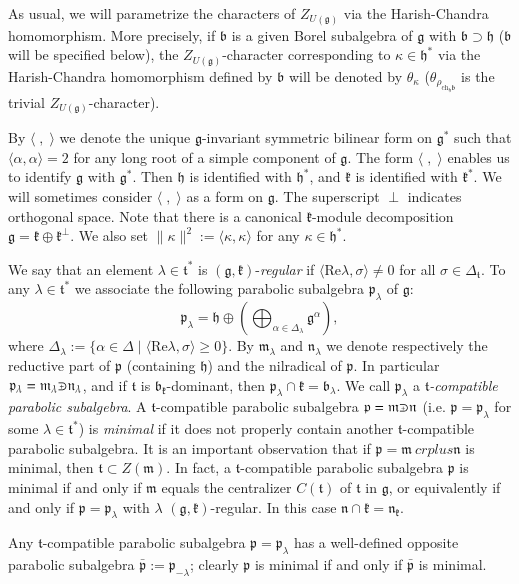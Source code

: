 \documentclass[11pt]{amsart}
\renewcommand{\tt}{\mathfrak{t}}
\newcommand{\kk}{\mathfrak{k}}
\newcommand{\nn}{\mathfrak{n}}
\newcommand{\mm}{\mathfrak{m}}
\newcommand{\hh}{\mathfrak{h}}
\newcommand{\pp}{\mathfrak{p}}
\renewcommand{\gg}{\mathfrak{g}}
\newcommand{\bb}{\mathfrak{b}}
\newcommand{\ch}{\mathrm{ch}}
\def\crplus{\hbox{$\supset${\raise1.05pt\hbox{\kern -0.55em ${\scriptscriptstyle +}$}}\ }}
\begin{document}
As usual, we will parametrize the characters of $Z_{U(\gg)}$ via the Harish-Chandra homomorphism. More precisely, if $\bb$ is a given Borel subalgebra of $\gg$ with $\bb\supset\hh$ ($\bb$ will be specified below), the $Z_{U(\gg)}$-character corresponding to $\kappa\in\hh^*$ via the Harish-Chandra homomorphism defined by $\bb$ will be denoted by $\theta_\kappa$ ($\theta_{\rho_{\ch_\hh\bb}}$ is the trivial $Z_{U(\gg)}$-character).

By $\langle\;,\;\rangle$ we denote the unique $\gg$-invariant symmetric bilinear form on $\gg^*$ such that $\langle\alpha,\alpha\rangle=2$ for any long root of a simple component of $\gg$. The form $\langle\;,\;\rangle$ enables us to identify $\gg$ with $\gg^*$. Then $\hh$ is identified with $\hh^*$, and $\kk$ is identified with $\kk^*$. We will sometimes consider $\langle\;,\;\rangle$ as a form on $\gg$. The superscript $\perp$ indicates orthogonal space. Note that there is a canonical $\kk$-module decomposition $\gg=\kk\oplus\kk^\perp$. We also set $\parallel\kappa\parallel^2:=\langle\kappa,\kappa\rangle$ for any $\kappa\in\hh^*$.

We say that an element $\lambda\in\tt^*$ is $(\gg,\kk)$-\textit{regular} if $\langle\mathrm{Re}\lambda,\sigma\rangle\neq 0$ for all $\sigma\in\Delta_\tt$. To any $\lambda\in\tt^*$ we associate the following parabolic subalgebra $\pp_\lambda$ of $\gg$: $$\pp_\lambda=\hh\oplus(\bigoplus_{\alpha\in\Delta_\lambda}\gg^\alpha),$$ where $\Delta_\lambda:=\{\alpha\in\Delta\; |\; \langle\mathrm{Re}\lambda,\sigma\rangle\geq 0\}$. By $\mm_\lambda$ and $\nn_\lambda$ we denote respectively the reductive part of $\pp$ (containing $\hh$) and the nilradical of $\pp$. In particular $\pp_\lambda=\mm_\lambda\crplus\nn_\lambda$, and if $\tt$ is $\bb_\kk$-dominant, then $\pp_\lambda\cap\kk=\bb_\lambda$. We call $\pp_\lambda$ a \textit{$\tt$-compatible parabolic subalgebra}. A $\tt$-compatible parabolic subalgebra $\pp=\mm\crplus\nn$ (i.e. $\pp=\pp_\lambda$ for some $\lambda\in\tt^*$) is \textit{minimal} if it does not properly contain another $\tt$-compatible parabolic subalgebra. It is an important observation that if $\pp=\mm\
crplus\nn$ is minimal, then $\tt\subset Z(\mm)$. In fact, a $\tt$-compatible parabolic subalgebra $\pp$ is minimal if and only if $\mm$ equals the centralizer $C(\tt)$ of $\tt$ in $\gg$, or equivalently if and only if $\pp=\pp_\lambda$ with $\lambda$ $(\gg,\kk)$-regular. In this case $\nn\cap\kk =\nn_\kk$.

Any $\tt$-compatible parabolic subalgebra $\pp =\pp_\lambda$ has a well-defined opposite parabolic subalgebra $\bar{\pp}:=\pp_{-\lambda}$; clearly $\pp$ is minimal if and only if $\bar{\pp}$ is minimal.
\end{document}
